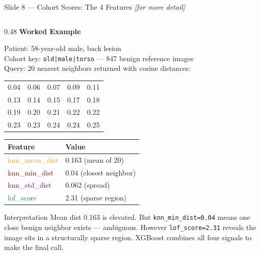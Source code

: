 \documentclass[aspectratio=169, 9pt]{beamer}
\begin{document}
\begin{frame}{Slide 8 --- Cohort Scores: The 4 Features \hfill{\small\textit{[for more detail]}}}
\begin{columns}[T]
    \begin{column}{0.48\textwidth}
      \textbf{\color{navyblue}Worked Example}

      \vspace{0.2em}
      {\scriptsize
      Patient: 58-year-old male, back lesion\\
      Cohort key: \texttt{old|male|torso} --- 847 benign reference images\\
      Query: 20 nearest neighbors returned with cosine distances:
      }

      \vspace{0.2em}
      {\scriptsize
      \begin{tabular}{@{} ccccc @{}}
        0.04 & 0.06 & 0.07 & 0.09 & 0.11 \\
        0.13 & 0.14 & 0.15 & 0.17 & 0.18 \\
        0.19 & 0.20 & 0.21 & 0.22 & 0.22 \\
        0.23 & 0.23 & 0.24 & 0.24 & 0.25 \\
      \end{tabular}
      }

      \vspace{0.3em}
      {\scriptsize
      \begin{tabular}{@{} ll @{}}
        \toprule
        Feature & Value \\
        \midrule
        \textcolor{orange}{knn\_mean\_dist} & 0.163 (mean of 20) \\
        \textcolor{darkred}{knn\_min\_dist}  & 0.04  (closest neighbor) \\
        \textcolor{purple}{knn\_std\_dist}  & 0.062 (spread) \\
        \textcolor{teal}{lof\_score}        & 2.31  (sparse region) \\
        \bottomrule
      \end{tabular}
      }

      \vspace{0.3em}
      \begin{alertblock}{Interpretation}
        \scriptsize
        Mean dist 0.163 is elevated. But \texttt{knn\_min\_dist=0.04}
        means one close benign neighbor exists --- ambiguous.
        However \texttt{lof\_score=2.31} reveals the image sits in
        a structurally sparse region. XGBoost combines all four
        signals to make the final call.
      \end{alertblock}
    \end{column}

  \end{columns}
\end{frame}
\end{document}
